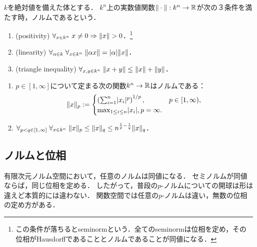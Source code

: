 \documentclass[uplatex, dvipdfmx]{jsreport}
\begin{document}
\begin{definition}[norm]
    $k$を絶対値を備えた体とする．
    $k^n$上の実数値関数$\|\cdot\|:k^n\to\mathbb{R}$が次の３条件を満たす時，ノルムであるという．
    \begin{enumerate}
        \item (positivity) $\forall_{x\in k^n}\;x\ne 0\Rightarrow\norm{x}> 0$．\footnote{この条件が落ちるとseminormという．全てのseminormは位相を定め，その位相がHausdorffであることとノルムであることが同値になる．}
        \item (linearity) $\forall_{\alpha\in k}\;\forall_{x\in k^n}\;\|\alpha x\|=\lvert\alpha\rvert\|x\|$．
        \item (triangle inequality) $\forall_{x,y\in k^n}\;\|x+y\|\le\|x\|+\|y\|$．
    \end{enumerate}
\end{definition}

\begin{proposition}[p-norm]\mbox{}
    \begin{enumerate}
        \item 
    $p\in[1,\infty]$について定まる次の関数$k^n\to\mathbb{R}$はノルムである：
    \[
        \|x\|_p:=\begin{cases}
            \left(\sum^n_{i=1}\lvert x_i\rvert^p\right)^{1/p},&p\in[1,\infty),\\
            \max_{1\le i\le n}\lvert x_i\rvert,p=\infty.
        \end{cases}
    \]
    \item $\forall_{p<q\in[1,\infty]}\;\forall_{x\in k^n}\;\|x\|_p\le\|x\|_q\le n^{\frac{1}{p}-\frac{1}{q}}\|x\|_q$．
    \end{enumerate}
\end{proposition}

\subsection{ノルムと位相}

\begin{tcolorbox}[colframe=ForestGreen, colback=ForestGreen!10!white,breakable,colbacktitle=ForestGreen!40!white,coltitle=black,fonttitle=\bfseries\sffamily,
title=]
    有限次元ノルム空間において，任意のノルムは同値になる．
    セミノルムが同値ならば，同じ位相を定める．
    したがって，普段の$p$-ノルムについての開球は形は違えど本質的には違わない．
    関数空間では任意の$p$-ノルムは違い，無数の位相の定め方がある．
\end{tcolorbox}
\end{document}
